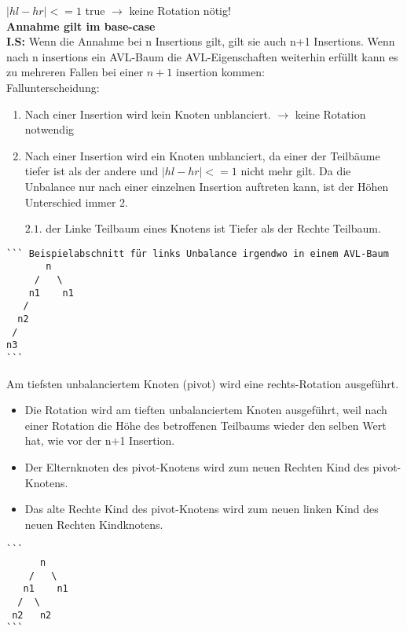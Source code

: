 $|hl - hr| <= 1$ true $\rightarrow$ keine Rotation nötig!\\
\textbf{Annahme gilt im base-case}\\

\textbf{I.S:} Wenn die Annahme bei n Insertions gilt, gilt sie auch n+1 Insertions. Wenn nach n insertions ein AVL-Baum die AVL-Eigenschaften weiterhin erfüllt kann es zu mehreren Fallen bei einer $n+1$ insertion kommen:\\
Fallunterscheidung:
\begin{enumerate}
	\item Nach einer Insertion wird kein Knoten unblanciert. $\rightarrow$ keine Rotation notwendig
	\item Nach einer Insertion wird ein Knoten unblanciert, da einer der Teilbäume tiefer ist als der andere und $|hl - hr| <= 1$  nicht mehr gilt.
Da die Unbalance nur nach einer einzelnen Insertion auftreten kann, ist der Höhen Unterschied immer 2.
	\item[$2.1.$] der Linke Teilbaum eines Knotens ist Tiefer als der Rechte Teilbaum.
\end{enumerate}

\begin{verbatim}
``` Beispielabschnitt für links Unbalance irgendwo in einem AVL-Baum
       n
     /   \
    n1    n1
   /
  n2
 /
n3
```
\end{verbatim}

Am tiefsten unbalanciertem Knoten (pivot) wird eine rechts-Rotation ausgeführt.
\begin{itemize}
	\item Die Rotation wird am tieften unbalanciertem Knoten ausgeführt, weil nach einer Rotation die Höhe des betroffenen Teilbaums wieder den selben Wert hat, wie vor der n+1 Insertion.
	\item Der Elternknoten des pivot-Knotens wird zum neuen Rechten Kind des pivot-Knotens.
	\item Das alte Rechte Kind des pivot-Knotens wird zum neuen linken Kind des neuen Rechten Kindknotens.
\end{itemize}

\begin{verbatim}
```
      n
    /   \
   n1    n1
  /  \
 n2   n2
```
\end{verbatim}

